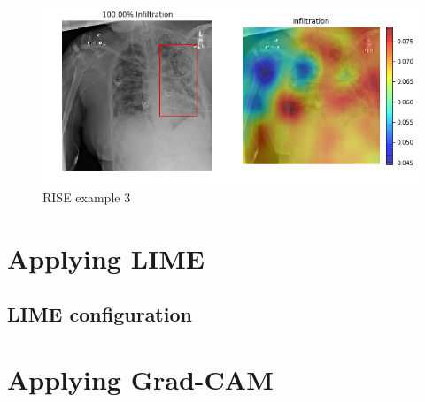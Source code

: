 \begin{figure}[h]
\centering
\caption{RISE example 3}
\includegraphics[width=12cm]{chapters/03_classification/images/rise_8.png}
\end{figure}


\section{Applying LIME}


\subsection{LIME configuration}

\section{Applying Grad-CAM}
